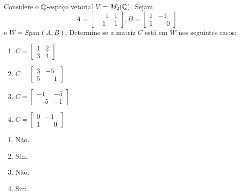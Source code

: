 \documentclass[12pt]{exam}
\begin{document}
\begin{exercicio}
    Considere o $\mathbb{Q}$-espaço vetorial $V = M_2(\mathbb{Q})$. Sejam
    \[
        A = \begin{bmatrix}
            \phantom{-} 1 & 1\\
            -1 & 1
        \end{bmatrix},
        B = \begin{bmatrix}
            1 & -1\\
            1 & \phantom{-} 0
        \end{bmatrix}
    \]
    e $W = Span(A, B)$. Determine se a matriz $C$ está em $W$ nos seguintes casos:
    \begin{multicols}{2}
      \begin{enumerate}[label={\alph*})]
          \item $C = \begin{bmatrix}1 & 2\\3 & 4\end{bmatrix}$

          \item $C = \begin{bmatrix}3 & -5\\5 & \phantom{-} 1\end{bmatrix}$

          \item $C = \begin{bmatrix}-1 & -5\\ \phantom{-} 5 & -1\end{bmatrix}$
        
          \item $C = \begin{bmatrix}0 & -1\\1 & \phantom{-} 0\end{bmatrix}$
      \end{enumerate}
    \end{multicols}
    \begin{solucao}
      \begin{multicols}{2}
        \begin{enumerate}[label={\alph*})]
          \item Não.

          \item Sim.

          \item Não.

          \item Sim.
        \end{enumerate}
      \end{multicols}
    \end{solucao}
\end{exercicio}
\end{document}
